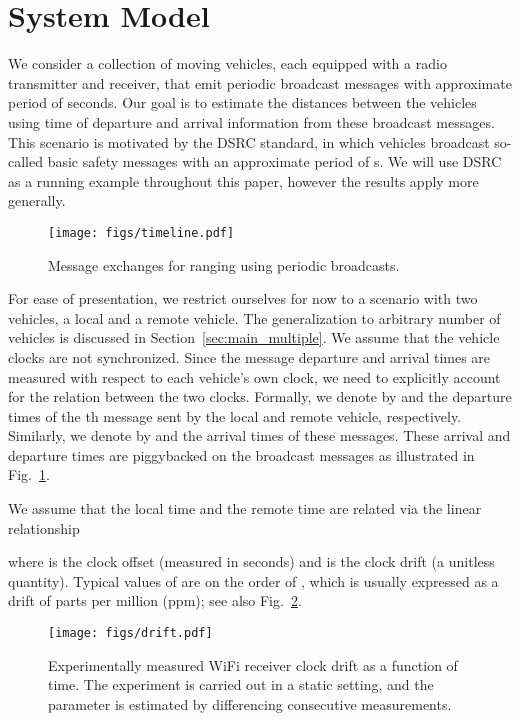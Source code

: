 \documentclass[12pt,journal,final,onecolumn]{IEEEtran}
\theoremstyle{definition}
\theoremstyle{myremark}
\begin{document}
\section{System Model}
\label{sec:system}

We consider a collection of moving vehicles, each equipped with a radio
transmitter and receiver, that emit periodic broadcast messages with approximate
period of  seconds. Our goal is to estimate the distances between the
vehicles using time of departure and arrival information from these broadcast
messages. This scenario is motivated by the DSRC standard, in which vehicles
broadcast so-called basic safety messages with an approximate period of  s. We will use DSRC as a running example throughout this paper, however the
results apply more generally.

\begin{figure}[htbp]
    \centering 
    \texttt{[image: figs/timeline.pdf]} 

    \caption{Message exchanges for ranging using periodic broadcasts.}
    \label{fig:timeline}
\end{figure}

For ease of presentation, we restrict ourselves for now to a scenario with two
vehicles, a local and a remote vehicle. The generalization to arbitrary number
of vehicles is discussed in Section~\ref{sec:main_multiple}. We assume that the
vehicle clocks are not synchronized. Since the message departure and arrival
times are measured with respect to each vehicle's own clock, we need to
explicitly account for the relation between the two clocks. Formally, we denote
by  and  the departure times of the \/th message sent by the
local and remote vehicle, respectively. Similarly, we denote by  and
 the arrival times of these messages. These arrival and departure times
are piggybacked on the broadcast messages as illustrated in
Fig.~\ref{fig:timeline}.

We assume that the local time  and the remote time  are related via the
linear relationship

where  is the clock offset (measured in seconds) and  is the
clock drift (a unitless quantity). Typical values of  are on the
order of , which is usually expressed as a drift of  parts per
million (ppm); see also Fig.~\ref{fig:drift}. 

\begin{figure}[htbp]
    \centering 
    \texttt{[image: figs/drift.pdf]} 

    \caption{Experimentally measured WiFi receiver clock drift  as a
    function of time. The experiment is carried out in a static setting, and the
    parameter  is estimated by differencing consecutive measurements.}

    \label{fig:drift}
\end{figure}
\end{document}
